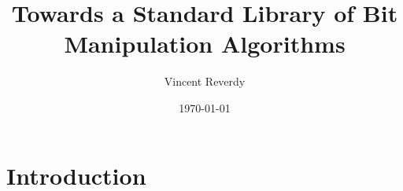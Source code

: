 \documentclass[letterpaper, 8pt, twocolumn]{article}
\title{Towards a Standard Library of Bit Manipulation Algorithms}
\author{%
Vincent Reverdy%
}
\date{\today}
\begin{document}
\maketitle
\begin{abstract}
\label{sec:abstract}
\end{abstract}
\section{Introduction}
\label{sec:introduction}

\end{document}
